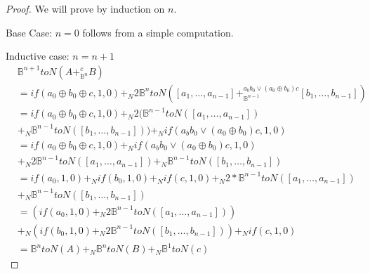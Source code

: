 \documentclass[14pt]{extarticle}  %
\begin{document}
\begin{proof}
  We will prove by induction on $n$.

  Base Case: $n=0$ follows from a simple computation.

  Inductive case: $n=n+1$
  \begin{align*}
    &\mathbb{B}^{n+1}toN(A +_{\mathbb{B}^{n}}^{c} B)\\
    &=  if( a_{0} \oplus b_{0} \oplus c ,1 , 0  ) +_{N} 2  \mathbb{B}^{n}toN([a_{1}, \ldots , a_{n - 1}] +_{\mathbb{B}^{n-1}}^{a_{b}b_{0} \lor (a_{0}\oplus b_{0}) c} [b_{1}, \ldots, b_{n-1}]) \\
    &=   if( a_{0} \oplus b_{0} \oplus c ,1 , 0  )  +_{N} 2 (\mathbb{B}^{n-1}toN([a_{1}, \ldots , a_{n - 1}]) \\
    &  +_{N} \mathbb{B}^{n-1}toN([b_{1}, \ldots, b_{n-1}])) +_{N} if(a_{b}b_{0} \lor (a_{0}\oplus b_{0}) c,1,0) \\
    &=   if( a_{0} \oplus b_{0} \oplus c ,1 , 0  ) +_{N} if(a_{b}b_{0} \lor (a_{0}\oplus b_{0}) c,1,0) \\
    &  +_{N} 2 \mathbb{B}^{n-1}toN([a_{1}, \ldots , a_{n - 1}]) +_{N} \mathbb{B}^{n-1}toN([b_{1}, \ldots, b_{n-1}])  \\
    &=   if(a_{0},1,0) +_{N} if(b_{0},1,0) +_{N} if(c,1,0)  +_{N} 2 * \mathbb{B}^{n-1}toN([a_{1}, \ldots , a_{n - 1}]) \\
    &  +_{N} \mathbb{B}^{n-1}toN([b_{1}, \ldots, b_{n-1}])   \\
    &=   (if(a_{0},1,0) +_{N} 2  \mathbb{B}^{n-1}toN([a_{1}, \ldots , a_{n - 1}]) ) \\
    & +_{N} (if(b_{0},1,0) +_{N} 2\mathbb{B}^{n-1}toN([b_{1}, \ldots, b_{n-1}]) ) +_{N} if(c,1,0)   \\
    &=   \mathbb{B}^{n}toN(A) +_{N} \mathbb{B}^{n}toN(B) +_{N}  \mathbb{B}^{1}toN(c)
\end{align*}
\end{proof}




\end{document}
